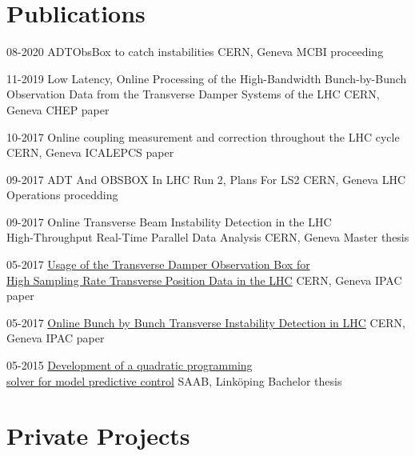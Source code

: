 \documentclass[]{cv-style}          %
\begin{document}
\section{Publications}
\begin{entrylist}  
           \entry
    {08-2020}
    {ADTObsBox to catch instabilities}
    {CERN, Geneva}
    {\emph{}{MCBI proceeding}}   
   
      \entry
    {11-2019}
    {Low Latency, Online Processing of the High-Bandwidth Bunch-by-Bunch \\ Observation Data from the Transverse Damper Systems of the LHC}
    {CERN, Geneva}
    {\emph{}{CHEP paper}}  
    
      \entry
    {10-2017}
    {Online coupling measurement and correction throughout the LHC cycle}
    {CERN, Geneva}
    {\emph{}{ICALEPCS paper}}   

  
      \entry
    {09-2017}
    {ADT And OBSBOX In LHC Run 2, Plans For LS2}
    {CERN, Geneva}
    {\emph{}{LHC Operations procedding}}
       
      \entry
    {09-2017}
    {Online Transverse Beam Instability Detection in the LHC\\High-Throughput Real-Time Parallel Data Analysis}
    {CERN, Geneva}
    {\emph{}{Master thesis}}

      \entry
    {05-2017}
    {\href{http://accelconf.web.cern.ch/AccelConf/ipac2017/papers/mopab117.pdf}{Usage of the Transverse Damper Observation Box for \\High Sampling Rate Transverse Position Data in the LHC}}
    {CERN, Geneva}
    {\emph{}{IPAC paper}}

  \entry
    {05-2017}
    {\href{http://accelconf.web.cern.ch/AccelConf/ipac2017/papers/mopab117.pdf}{Online Bunch by Bunch Transverse Instability Detection in LHC}}
    {CERN, Geneva}
    {\emph{}{IPAC paper}}
  

  \entry
    {05-2015}
    {\href{http://liu.diva-portal.org/smash/get/diva2:844414/FULLTEXT01.pdf}{Development of a quadratic programming \\ solver for model predictive control}}
    {SAAB, Linköping}
    {\emph{}{Bachelor thesis}}
   
    
\end{entrylist}

\section{Private Projects}
\end{document}
